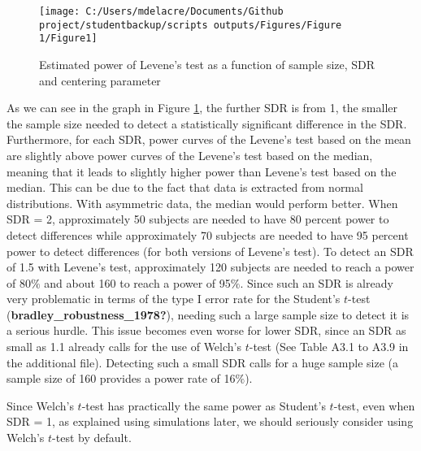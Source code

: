 \documentclass[
  english,
  man]{apa6}
\begin{document}
\begin{figure}

{\centering \texttt{[image: C:/Users/mdelacre/Documents/Github project/studentbackup/scripts outputs/Figures/Figure 1/Figure1]} 

}

\caption{Estimated power of Levene's test as a function of sample size, SDR and centering parameter}\label{fig:chp2fig1}
\end{figure}

As we can see in the graph in Figure \ref{fig:chp2fig1}, the further SDR is from 1, the smaller the sample size needed to detect a statistically significant difference in the SDR. Furthermore, for each SDR, power curves of the Levene's test based on the mean are slightly above power curves of the Levene's test based on the median, meaning that it leads to slightly higher power than Levene's test based on the median. This can be due to the fact that data is extracted from normal distributions. With asymmetric data, the median would perform better. When SDR = 2, approximately 50 subjects are needed to have 80 percent power to detect differences while approximately 70 subjects are needed to have 95 percent power to detect differences (for both versions of Levene's test). To detect an SDR of 1.5 with Levene's test, approximately 120 subjects are needed to reach a power of 80\(\%\) and about 160 to reach a power of 95\(\%\). Since such an SDR is already very problematic in terms of the type I error rate for the Student's \(t\)-test (\textbf{bradley\_robustness\_1978?}), needing such a large sample size to detect it is a serious hurdle. This issue becomes even worse for lower SDR, since an SDR as small as 1.1 already calls for the use of Welch's \(t\)-test (See Table A3.1 to A3.9 in the additional file). Detecting such a small SDR calls for a huge sample size (a sample size of 160 provides a power rate of 16\(\%\)).

Since Welch's \(t\)-test has practically the same power as Student's \(t\)-test, even when SDR = 1, as explained using simulations later, we should seriously consider using Welch's \(t\)-test by default.
\end{document}
